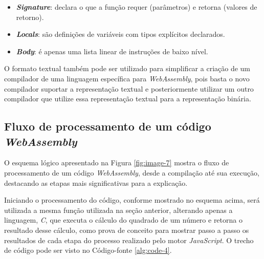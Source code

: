 \begin{itemize}
    \item \textbf{\textit{Signature}}: declara o que a função requer (parâmetros) e
    retorna (valores de retorno).
    \item \textbf{\textit{Locals}}: são definições de variáveis com tipos explícitos
    declarados.
    \item \textbf{\textit{Body}}: é apenas uma lista linear de instruções de baixo nível.
\end{itemize}

O formato textual também pode ser utilizado para simplificar a criação de um compilador
de uma linguagem específica para \textit{WebAssembly}, pois basta o novo compilador
suportar a representação textual e posteriormente utilizar um outro compilador que utilize
essa representação textual para a representação binária.

\subsection{Fluxo de processamento de um código \textit{WebAssembly}}
\label{ssec:wa-flow}

O esquema lógico apresentado na Figura \ref{fig:image-7} mostra o fluxo de processamento
de um código \textit{WebAssembly}, desde a compilação até sua execução, destacando as
etapas mais significativas para a explicação.

\begin{figure}[h!]
    \centering
\end{figure}

Iniciando o processamento do código, conforme mostrado no esquema acima, será utilizada a
mesma função utilizada na seção anterior, alterando apenas a linguagem, \textit{C}, que
executa o cálculo do quadrado de um número e retorna o resultado desse cálculo, como prova
de conceito para mostrar passo a passo os resultados de cada etapa do processo realizado
pelo motor \textit{JavaScript}. O trecho de código pode ser visto no Código-fonte
\ref{alg:code-4}.


